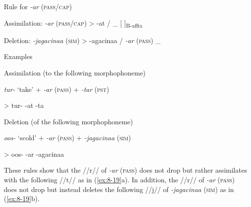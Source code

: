 \ea\label{ex:8-18}
  Rule for \textit{-ar} (\textsc{pass}/\textsc{cap})

\ea Assimilation:  \textit{-ar} (\textsc{pass}/\textsc{cap})  >  -at  /  \_  [  ]\textsubscript{B-affix}


\ex Deletion:  \textit{-jagacinaa} (\textsc{sim})  >  -agacinaa  /  \textit{-ar} (\textsc{pass})  \_
\z

\ea\label{ex:8-19}
  Examples

\ea Assimilation (to the following morphophoneme)

      \textit{tur-}  ‘take’  +  \textit{-ar} (\textsc{pass})  +  \textit{-tar} (\textsc{pst})

    >  tur-      -at      -ta


\ex Deletion (of the following morphophoneme)

      \textit{oos-}  ‘scold’  +  \textit{-ar} (\textsc{pass})  +  \textit{-jagacinaa} (\textsc{sim})

    >  oos-      -ar      -agacinaa
\z

These rules show that the //r// of \textit{-ar} (\textsc{pass}) does not drop but rather assimilates with the following //t// as in (\ref{ex:8-19}a). In addition, the //r// of \textit{-ar} (\textsc{pass}) does not drop but instead deletes the following //j// of \textit{-jagacinaa} (\textsc{sim}) as in (\ref{ex:8-19}b).

